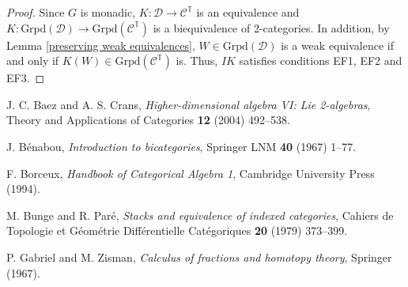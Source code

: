 \documentclass{book}
\newcommand{\C}{\mathcal{C}}
\newcommand{\D}{\mathcal{D}}
\newcommand{\T}{\mathbb{T}}
\begin{document}
\begin{proof}
Since $G$ is monadic, $K: \D \rightarrow \C^{\T}$ is an equivalence and $K: \text{Grpd}(\D) \rightarrow \text{Grpd}(\C^{\T})$ is a
biequivalence of 2-categories.
In addition, by Lemma \ref{preserving weak equivalences}, $W \in \text{Grpd}(\D)$ is a weak equivalence if and only if $K(W) \in \text{Grpd}(\C^{\T})$ is.
Thus, $IK$ satisfies conditions EF1, EF2 and EF3.
\end{proof}



\begin{thebibliography}{12}


{J. C. Baez and A. S. Crans}, \textit{Higher-dimensional algebra VI: Lie 2-algebras}, {Theory and Applications of Categories}
\textbf{12} (2004) 492--538.

{J. B\'enabou}, \textit{Introduction to bicategories}, {Springer LNM} \textbf{40} (1967) 1--77.

{F. Borceux}, \textit{ Handbook of Categorical Algebra 1}, {Cambridge University Press} (1994).

{M. Bunge and R. Par\'e}, \textit{Stacks and equivalence of indexed categories}, {Cahiers de Topologie et G\'eom\'etrie Diff\'erentielle
Cat\'egoriques}
\textbf{20} (1979) 373--399.

{P. Gabriel and M. Zisman}, \textit{Calculus of fractions and homotopy theory}, {Springer} (1967).


\end{thebibliography}
\end{document}
